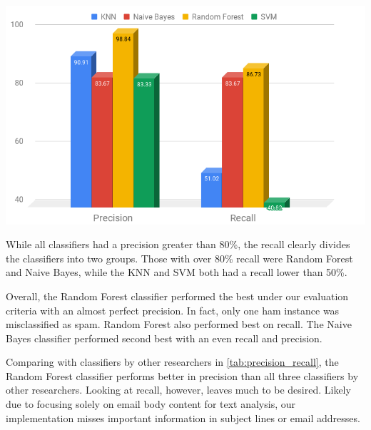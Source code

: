 \documentclass[12pt]{article}
\newenvironment{Figure}
  {\par\medskip\noindent\minipage{\linewidth}}
  {\endminipage\par\medskip}
\begin{document}
\begin{multicols}{2}
                \begin{Figure}
                    \centering
                    \includegraphics[width=\linewidth]{figures/precision_recall.png}
                    \label{fig:precision_recall}
                \end{Figure}

                While all classifiers had a precision greater than 80\%, the recall clearly divides the 
                classifiers into two groups. Those with over 80\% recall were Random Forest and Naive Bayes, 
                while the KNN and SVM both had a recall lower than 50\%. 
                
                Overall, the Random Forest classifier performed the best under our evaluation criteria 
                with an almost perfect precision. In fact, only one ham instance was misclassified as spam. 
                Random Forest also performed best on recall. The Naive Bayes classifier performed second best 
                with an even recall and precision.

                Comparing with classifiers by other researchers in \autoref{tab:precision_recall}, the 
                Random Forest classifier performs better in precision than all three classifiers by other researchers. 
                Looking at recall, however, leaves much to be desired. Likely due to focusing solely on email body 
                content for text analysis, our implementation misses important information in subject lines or 
                email addresses.



\end{multicols}
\end{document}
